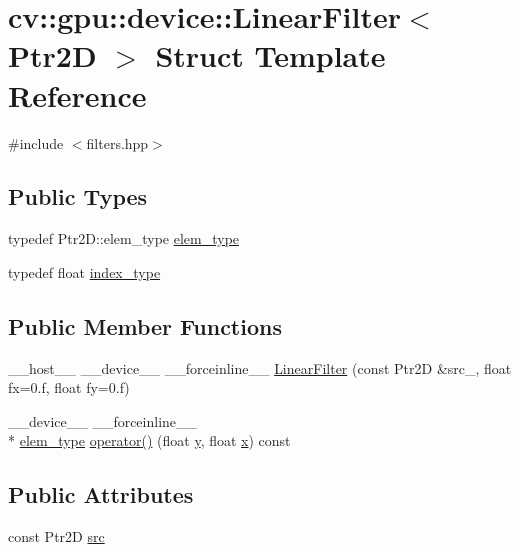 \hypertarget{structcv_1_1gpu_1_1device_1_1LinearFilter}{\section{cv\-:\-:gpu\-:\-:device\-:\-:Linear\-Filter$<$ Ptr2\-D $>$ Struct Template Reference}
\label{structcv_1_1gpu_1_1device_1_1LinearFilter}
}


{\ttfamily \#include $<$filters.\-hpp$>$}

\subsection*{Public Types}
\begin{DoxyCompactItemize}
\item 
typedef Ptr2\-D\-::elem\-\_\-type \hyperlink{structcv_1_1gpu_1_1device_1_1LinearFilter_a2fa48a5fc0557a0d688d82ded14096c0}{elem\-\_\-type}
\item 
typedef float \hyperlink{structcv_1_1gpu_1_1device_1_1LinearFilter_a2a95478e8c9682dcc4d4ecec280eaf64}{index\-\_\-type}
\end{DoxyCompactItemize}
\subsection*{Public Member Functions}
\begin{DoxyCompactItemize}
\item 
\-\_\-\-\_\-host\-\_\-\-\_\- \-\_\-\-\_\-device\-\_\-\-\_\- \-\_\-\-\_\-forceinline\-\_\-\-\_\- \hyperlink{structcv_1_1gpu_1_1device_1_1LinearFilter_afd394d5a4993f74969370b4e5166fb80}{Linear\-Filter} (const Ptr2\-D \&src\-\_\-, float fx=0.f, float fy=0.f)
\item 
\-\_\-\-\_\-device\-\_\-\-\_\- \-\_\-\-\_\-forceinline\-\_\-\-\_\- \\*
\hyperlink{structcv_1_1gpu_1_1device_1_1LinearFilter_a2fa48a5fc0557a0d688d82ded14096c0}{elem\-\_\-type} \hyperlink{structcv_1_1gpu_1_1device_1_1LinearFilter_a277a1e59d90a1cd0b62d37a603495afa}{operator()} (float \hyperlink{highgui__c_8h_af1202c02b14870c18fb3a1da73e9e7c7}{y}, float \hyperlink{highgui__c_8h_a6150e0515f7202e2fb518f7206ed97dc}{x}) const 
\end{DoxyCompactItemize}
\subsection*{Public Attributes}
\begin{DoxyCompactItemize}
\item 
const Ptr2\-D \hyperlink{structcv_1_1gpu_1_1device_1_1LinearFilter_a536017f297d84521d07d9c2677b3dcc5}{src}
\end{DoxyCompactItemize}


